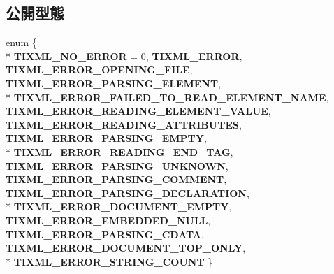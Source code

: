 \subsection*{公開型態}
\begin{DoxyCompactItemize}
\item 
enum \{ \\*
{\bfseries T\+I\+X\+M\+L\+\_\+\+N\+O\+\_\+\+E\+R\+R\+OR} = 0, 
{\bfseries T\+I\+X\+M\+L\+\_\+\+E\+R\+R\+OR}, 
{\bfseries T\+I\+X\+M\+L\+\_\+\+E\+R\+R\+O\+R\+\_\+\+O\+P\+E\+N\+I\+N\+G\+\_\+\+F\+I\+LE}, 
{\bfseries T\+I\+X\+M\+L\+\_\+\+E\+R\+R\+O\+R\+\_\+\+P\+A\+R\+S\+I\+N\+G\+\_\+\+E\+L\+E\+M\+E\+NT}, 
\\*
{\bfseries T\+I\+X\+M\+L\+\_\+\+E\+R\+R\+O\+R\+\_\+\+F\+A\+I\+L\+E\+D\+\_\+\+T\+O\+\_\+\+R\+E\+A\+D\+\_\+\+E\+L\+E\+M\+E\+N\+T\+\_\+\+N\+A\+ME}, 
{\bfseries T\+I\+X\+M\+L\+\_\+\+E\+R\+R\+O\+R\+\_\+\+R\+E\+A\+D\+I\+N\+G\+\_\+\+E\+L\+E\+M\+E\+N\+T\+\_\+\+V\+A\+L\+UE}, 
{\bfseries T\+I\+X\+M\+L\+\_\+\+E\+R\+R\+O\+R\+\_\+\+R\+E\+A\+D\+I\+N\+G\+\_\+\+A\+T\+T\+R\+I\+B\+U\+T\+ES}, 
{\bfseries T\+I\+X\+M\+L\+\_\+\+E\+R\+R\+O\+R\+\_\+\+P\+A\+R\+S\+I\+N\+G\+\_\+\+E\+M\+P\+TY}, 
\\*
{\bfseries T\+I\+X\+M\+L\+\_\+\+E\+R\+R\+O\+R\+\_\+\+R\+E\+A\+D\+I\+N\+G\+\_\+\+E\+N\+D\+\_\+\+T\+AG}, 
{\bfseries T\+I\+X\+M\+L\+\_\+\+E\+R\+R\+O\+R\+\_\+\+P\+A\+R\+S\+I\+N\+G\+\_\+\+U\+N\+K\+N\+O\+WN}, 
{\bfseries T\+I\+X\+M\+L\+\_\+\+E\+R\+R\+O\+R\+\_\+\+P\+A\+R\+S\+I\+N\+G\+\_\+\+C\+O\+M\+M\+E\+NT}, 
{\bfseries T\+I\+X\+M\+L\+\_\+\+E\+R\+R\+O\+R\+\_\+\+P\+A\+R\+S\+I\+N\+G\+\_\+\+D\+E\+C\+L\+A\+R\+A\+T\+I\+ON}, 
\\*
{\bfseries T\+I\+X\+M\+L\+\_\+\+E\+R\+R\+O\+R\+\_\+\+D\+O\+C\+U\+M\+E\+N\+T\+\_\+\+E\+M\+P\+TY}, 
{\bfseries T\+I\+X\+M\+L\+\_\+\+E\+R\+R\+O\+R\+\_\+\+E\+M\+B\+E\+D\+D\+E\+D\+\_\+\+N\+U\+LL}, 
{\bfseries T\+I\+X\+M\+L\+\_\+\+E\+R\+R\+O\+R\+\_\+\+P\+A\+R\+S\+I\+N\+G\+\_\+\+C\+D\+A\+TA}, 
{\bfseries T\+I\+X\+M\+L\+\_\+\+E\+R\+R\+O\+R\+\_\+\+D\+O\+C\+U\+M\+E\+N\+T\+\_\+\+T\+O\+P\+\_\+\+O\+N\+LY}, 
\\*
{\bfseries T\+I\+X\+M\+L\+\_\+\+E\+R\+R\+O\+R\+\_\+\+S\+T\+R\+I\+N\+G\+\_\+\+C\+O\+U\+NT}
 \}\hypertarget{class_ti_xml_base_a99a2fe4c7ab51f1be33d349c5fd382e8}{}\label{class_ti_xml_base_a99a2fe4c7ab51f1be33d349c5fd382e8}

\end{DoxyCompactItemize}
